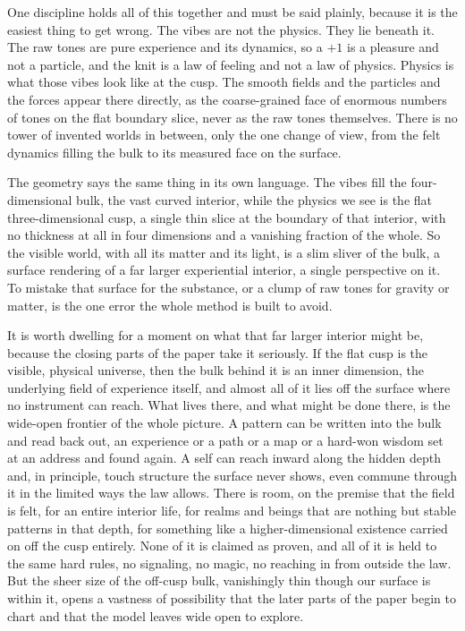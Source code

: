 One discipline holds all of this together and must be said plainly, because it is the easiest thing to get wrong. The vibes are not the physics. They lie beneath it. The raw tones are pure experience and its dynamics, so a $+1$ is a pleasure and not a particle, and the knit is a law of feeling and not a law of physics. Physics is what those vibes look like at the cusp. The smooth fields and the particles and the forces appear there directly, as the coarse-grained face of enormous numbers of tones on the flat boundary slice, never as the raw tones themselves. There is no tower of invented worlds in between, only the one change of view, from the felt dynamics filling the bulk to its measured face on the surface.

The geometry says the same thing in its own language. The vibes fill the four-dimensional bulk, the vast curved interior, while the physics we see is the flat three-dimensional cusp, a single thin slice at the boundary of that interior, with no thickness at all in four dimensions and a vanishing fraction of the whole. So the visible world, with all its matter and its light, is a slim sliver of the bulk, a surface rendering of a far larger experiential interior, a single perspective on it. To mistake that surface for the substance, or a clump of raw tones for gravity or matter, is the one error the whole method is built to avoid.

It is worth dwelling for a moment on what that far larger interior might be, because the closing parts of the paper take it seriously. If the flat cusp is the visible, physical universe, then the bulk behind it is an inner dimension, the underlying field of experience itself, and almost all of it lies off the surface where no instrument can reach. What lives there, and what might be done there, is the wide-open frontier of the whole picture. A pattern can be written into the bulk and read back out, an experience or a path or a map or a hard-won wisdom set at an address and found again. A self can reach inward along the hidden depth and, in principle, touch structure the surface never shows, even commune through it in the limited ways the law allows. There is room, on the premise that the field is felt, for an entire interior life, for realms and beings that are nothing but stable patterns in that depth, for something like a higher-dimensional existence carried on off the cusp entirely. None of it is claimed as proven, and all of it is held to the same hard rules, no signaling, no magic, no reaching in from outside the law. But the sheer size of the off-cusp bulk, vanishingly thin though our surface is within it, opens a vastness of possibility that the later parts of the paper begin to chart and that the model leaves wide open to explore.

